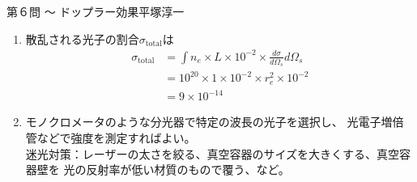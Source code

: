 \begin{answer}{第６問 〜 ドップラー効果}{平塚淳一}
\begin{enumerate}
  となるので、この広がりの幅$\Delta \omega = \omega-\omega_0$は
  \begin{equation}
  \frac{1}{e} = \exp(-\frac{m_e c^2(\Delta \omega)^2}{4\kB T_e \omega^2_0})
  \end{equation}
  から
  \begin{equation}
  \Delta \omega =2\omega_0\sqrt{\frac{\kB T_e}{m_ec^2}}
  \end{equation}
  ２つのガウス型曲線を合成した曲線の幅$\Delta \omega$は
  各々のガウス型曲線の幅$\Delta \omega_1,\Delta \omega_2$を用いて
  \begin{equation}
  (\Delta \omega)^2= (\Delta \omega_1)^2+(\Delta \omega_2)^2
  \end{equation}
  となることを知っているとより簡単に答えられることに注意。\\
  スペクトルの図は略します。いつものガウス曲線(縦軸に強度、横軸に$\omega$)を描いて、
  ピークにあたる$\omega$を$\omega_0$、強度が$1/e$になる$\omega$と$\omega_0$との幅を$\Delta \omega$とすればよい。
\item 散乱される光子の割合$\sigma_\mathrm{total}$は
  \begin{align}
  \sigma_\mathrm{total}
  &=\int n_e \times L\times 10^{-2}\times \frac{d\sigma}{d\Omega_s} d\Omega_s\\
  &=10^{20} \times 1 \times 10^{-2} \times r^2_e \times 10^{-2}\\
  &=9 \times 10^{-14}
  \end{align}
\item モノクロメータのような分光器で特定の波長の光子を選択し、
  光電子増倍管などで強度を測定すればよい。\\
  迷光対策：レーザーの太さを絞る、真空容器のサイズを大きくする、真空容器壁を
  光の反射率が低い材質のもので覆う、など。
\end{enumerate}
\end{answer}
